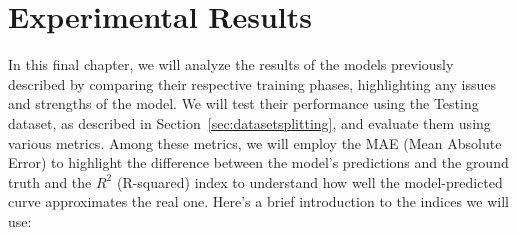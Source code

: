 \chapter{Experimental Results}
In this final chapter, we will analyze the results of the
models previously described by comparing their respective
training phases, highlighting any issues and strengths of the model.
We will test their performance using the Testing dataset,
as described in Section~\ref{sec:datasetsplitting}, and
evaluate them using various metrics.
Among these metrics, we will employ the MAE (Mean Absolute Error)
to highlight the difference between the model's predictions and
the ground truth and the $R^2$ (R-squared) index to understand how well
the model-predicted curve approximates the real one.
Here's a brief introduction to the indices we will use:



